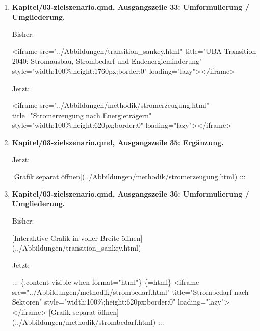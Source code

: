 \documentclass[
  ngerman,
  a4paper,
  DIV=11]{scrreprt}
\newenvironment{Shaded}{\begin{snugshade}}{\end{snugshade}}
\newcommand{\NormalTok}[1]{\textcolor[rgb]{0.00,0.23,0.31}{#1}}
\begin{document}
\begin{enumerate}
\def\labelenumi{\arabic{enumi}.}
\setcounter{enumi}{29}
\item
  \textbf{Kapitel/03-zielszenario.qmd, Ausgangszeile 33: Umformulierung
  / Umgliederung.}

  Bisher:

\begin{Shaded}
\begin{Highlighting}[]
\NormalTok{\textless{}iframe src="../Abbildungen/transition\_sankey.html" title="UBA Transition 2040: Stromausbau, Strombedarf und Endenergieminderung" style="width:100\%;height:1760px;border:0" loading="lazy"\textgreater{}\textless{}/iframe\textgreater{}}
\end{Highlighting}
\end{Shaded}

  Jetzt:

\begin{Shaded}
\begin{Highlighting}[]
\NormalTok{\textless{}iframe src="../Abbildungen/methodik/stromerzeugung.html" title="Stromerzeugung nach Energieträgern" style="width:100\%;height:620px;border:0" loading="lazy"\textgreater{}\textless{}/iframe\textgreater{}}
\end{Highlighting}
\end{Shaded}
\item
  \textbf{Kapitel/03-zielszenario.qmd, Ausgangszeile 35: Ergänzung.}

  Jetzt:

\begin{Shaded}
\begin{Highlighting}[]
\NormalTok{[Grafik separat öffnen](../Abbildungen/methodik/stromerzeugung.html)}
\NormalTok{:::}
\end{Highlighting}
\end{Shaded}
\item
  \textbf{Kapitel/03-zielszenario.qmd, Ausgangszeile 36: Umformulierung
  / Umgliederung.}

  Bisher:

\begin{Shaded}
\begin{Highlighting}[]
\NormalTok{[Interaktive Grafik in voller Breite öffnen](../Abbildungen/transition\_sankey.html)}
\end{Highlighting}
\end{Shaded}

  Jetzt:

\begin{Shaded}
\begin{Highlighting}[]
\NormalTok{::: \{.content{-}visible when{-}format="html"\}}
\NormalTok{\textasciigrave{}\textasciigrave{}\textasciigrave{}\{=html\}}
\NormalTok{\textless{}iframe src="../Abbildungen/methodik/strombedarf.html" title="Strombedarf nach Sektoren" style="width:100\%;height:620px;border:0" loading="lazy"\textgreater{}\textless{}/iframe\textgreater{}}
\NormalTok{\textasciigrave{}\textasciigrave{}\textasciigrave{}}
\NormalTok{[Grafik separat öffnen](../Abbildungen/methodik/strombedarf.html)}
\NormalTok{:::}


\end{Highlighting}
\end{Shaded}
\end{enumerate}
\end{document}

